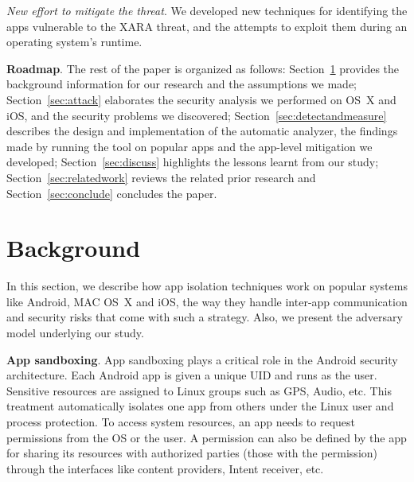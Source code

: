 \documentclass{article}
\newcommand{\ignore}[1]{}
\begin{document}
\vspace {2pt}\noindent\textit{ New effort to mitigate the threat}. We developed new techniques for identifying the apps vulnerable to the XARA threat, and the attempts to exploit them during an operating system's runtime. \ignore{We further discuss potential OS-level protection against this new type of security threat.}


\vspace {3pt}\noindent\textbf{Roadmap}.  The rest of the paper is organized as follows: Section~\ref{sec:background} provides the background information for our research and the assumptions we made; Section~\ref{sec:attack} elaborates the security analysis we performed on OS~X and iOS, and the security problems we discovered; Section~\ref{sec:detectandmeasure} describes the design and implementation of the automatic analyzer, the findings made by running the tool on popular apps and the app-level mitigation we developed; Section~\ref{sec:discuss} highlights the lessons learnt from our study; Section~\ref{sec:relatedwork} reviews the related prior research and Section~\ref{sec:conclude} concludes the paper.


\vspace {-8pt}
\section{Background}
\label{sec:background}


\ignore{As discussed earlier, modern OSes utilize various isolation techniques to separate apps from each other and limit the damage they may inflict on the system and other apps. }In this section, we describe how app isolation techniques work on popular systems like Android, MAC OS~X and iOS, the way they handle inter-app communication and security risks that come with such a strategy. Also, we present the adversary model underlying our study.

\vspace {3pt}\noindent\textbf{App sandboxing}. App sandboxing plays a critical role in the Android security architecture. Each Android app is given a unique UID and runs as the user. Sensitive resources are assigned to Linux groups such as GPS, Audio, etc. This treatment automatically isolates one app from others under the Linux user and process protection. To access system resources, an app needs to request permissions from the OS or the user.  A permission can also be defined by the app for sharing its resources with authorized parties (those with the permission) through the interfaces like content providers, Intent receiver, etc.
\end{document}
